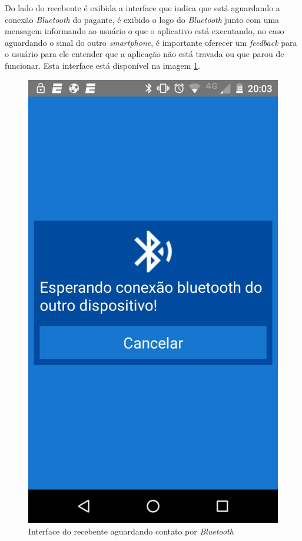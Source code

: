 \documentclass[hidelinks,12pt]{article}
\begin{document}
Do lado do recebente é exibida a interface que indica que está aguardando a conexão \textit{Bluetooth} do pagante, é exibido o logo do \textit{Bluetooth} junto com uma mensagem informando ao usuário o que o aplicativo está executando, no caso aguardando o sinal do outro \textit{smartphone}, é importante oferecer um \textit{feedback} para o usuário para ele entender que a aplicação não está travada ou que parou de funcionar. Esta interface está disponível na imagem \ref{bt}.
\begin{figure}[H]
	\centering
	\includegraphics[scale=0.3]{wait_bt} 
	\caption{Interface do recebente aguardando contato por \textit{Bluetooth}}
	\label{bt}
\end{figure}
\end{document}
